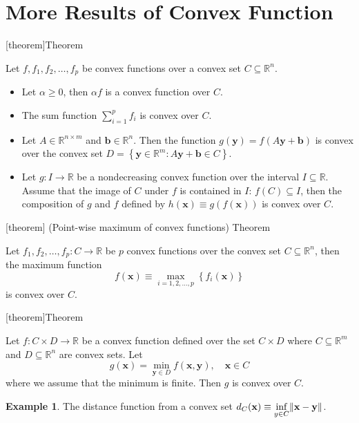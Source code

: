 \documentclass[12pt]{report}
\theoremstyle{definition}
\begin{document}
\section{More Results of Convex Function}

[theorem]{Theorem}
\begin{operations preserving convexity}
    Let $f,f_1,f_2,\ldots,f_p$ be convex functions over a convex set
    $C\subseteq\mathbb{R}^{n}$.
    \begin{itemize}
        \item Let $\alpha\ge 0$, then $\alpha f$ is a convex function over $C$.
        \item The sum function $\sum_{i=1}^{p} f_i$ is convex over $C$.
        \item Let $A\in\mathbb{R}^{n\times m}$ and
            $\mathbf{b}\in\mathbb{R}^{n}$. Then the function
            $g(\mathbf{y})=f(A\mathbf{y}+\mathbf{b})$
            is convex over the convex set
            $D=\left\{\mathbf{y}\in\mathbb{R}^{m}:A\mathbf{y}+\mathbf{b}\in C\right\}$.
        \item Let $g:I\rightarrow\mathbb{R}$ be a nondecreasing
            convex function over the interval $I\subseteq\mathbb{R}$.
            Assume that the image of $C$ under $f$ is contained in $I$:
            $f(C)\subseteq I$, then the composition of $g$ and $f$ defined by
            $h(\mathbf{x})\equiv g(f(\mathbf{x}))$ is convex over $C$.
    \end{itemize} 
\end{operations preserving convexity}

[theorem]
{(Point-wise maximum of convex functions) Theorem}
\begin{point-wise maximum of convex functions}
    Let $f_1,f_2,\ldots,f_p:C\rightarrow\mathbb{R}$ be $p$ convex functions over
    the convex set $C\subseteq\mathbb{R}^{n}$, then the maximum function
    \[
        f(\mathbf{x})\equiv
        \underset{i=1,2,\ldots,p}{\max}\left\{f_i(\mathbf{x})\right\}
    \]
    is convex over $C$.
\end{point-wise maximum of convex functions}

[theorem]{Theorem}
\begin{preservation of convexity under partial min}
    Let $f:C\times D\rightarrow\mathbb{R}$ be a convex function defined over the
    set $C\times D$ where $C\subseteq\mathbb{R}^{m}$ and
    $D\subseteq\mathbb{R}^{n}$ are convex sets. Let
    \[
        g(\mathbf{x})=\underset{\mathbf{y}\in D}{\min}f(\mathbf{x},\mathbf{y}),
        \quad\mathbf{x}\in C
    \]
    where we assume that the minimum is finite. Then $g$ is convex over $C$.
\end{preservation of convexity under partial min}
\newtheorem{partial min example}[theorem]{Example}
\begin{partial min example}
    The distance function from a convex set $d_C(\mathbf{x})\equiv
    \underset{y\in C}{\inf}\norm{\mathbf{x}-\mathbf{y}}$.
\end{partial min example}
\end{document}
